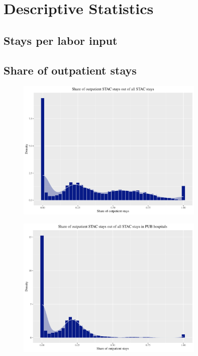 \section{Descriptive Statistics}
\subsection{Stays per labor input}


\clearpage



\clearpage



\clearpage
\subsection{Share of outpatient stays}
\begin{figure}[!htb]
    \centering
    \includegraphics[width=0.8\textwidth]{../../Figures/2016-2019/STAC_share_pool.pdf}
\end{figure}

\clearpage
\begin{figure}[!htb]
    \centering
    \includegraphics[width=0.8\textwidth]{../../Figures/2016-2019/STAC_share_PUB.pdf}
\end{figure}

